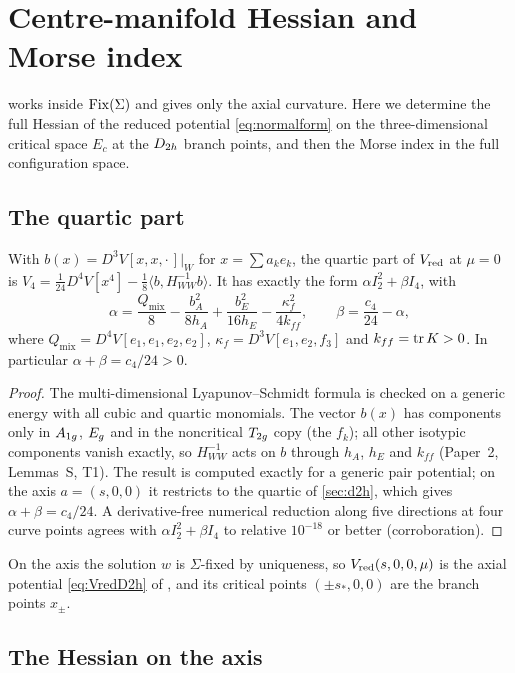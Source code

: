 \section{Centre-manifold Hessian and Morse index}\label{sec:index}

 works inside $\operatorname{Fix}(\Sigma)$ and gives only the axial curvature. Here we determine the full Hessian of the
reduced potential \eqref{eq:normalform} on the three-dimensional critical space $E_c$ at the $D_{2h}$ branch points, and
then the Morse index in the full configuration space.

\subsection{The quartic part}

\begin{lemma}\label{lem:quartic}
With $b(x)=D^3V[x,x,\cdot\,]|_W$ for $x=\sum a_ke_k$, the quartic part of $V_{\mathrm{red}}$ at $\mu=0$ is
$V_4=\frac1{24}D^4V[x^4]-\frac18\langle b,H_{WW}^{-1}b\rangle$. It has exactly the form $\alpha I_2^2+\beta I_4$, with
\[
\alpha=\frac{Q_{\mathrm{mix}}}{8}-\frac{b_A^2}{8h_A}+\frac{b_E^2}{16h_E}-\frac{\kappa_f^2}{4k_{ff}},\qquad
\beta=\frac{c_4}{24}-\alpha,
\]
where $Q_{\mathrm{mix}}=D^4V[e_1,e_1,e_2,e_2]$, $\kappa_f=D^3V[e_1,e_2,f_3]$ and $k_{ff}=\operatorname{tr} K>0$. In particular
$\alpha+\beta=c_4/24>0$.
\end{lemma}
\begin{proof}
The multi-dimensional Lyapunov--Schmidt formula is checked on a generic energy with all cubic and quartic monomials.
The vector $b(x)$ has components only in $A_{1g}$, $E_{g}$ and in the noncritical $T_{2g}$ copy (the $f_k$); all other isotypic
components vanish exactly, so $H_{WW}^{-1}$ acts on $b$ through $h_A$, $h_E$ and $k_{ff}$ (Paper~2, Lemmas~S, T1). The
result is computed exactly for a generic pair potential; on the axis $a=(s,0,0)$ it restricts to the quartic of
\cref{sec:d2h}, which gives $\alpha+\beta=c_4/24$. A derivative-free numerical reduction along five directions at four
curve points agrees with $\alpha I_2^2+\beta I_4$ to relative $10^{-18}$ or better (corroboration).
\end{proof}

On the axis the solution $w$ is $\Sigma$-fixed by uniqueness, so $V_{\mathrm{red}}(s,0,0,\mu)$ is the axial potential
\eqref{eq:VredD2h} of \propBtwo, and its critical points $(\pm s_*,0,0)$ are the branch points $x_\pm$.

\subsection{The Hessian on the axis}

